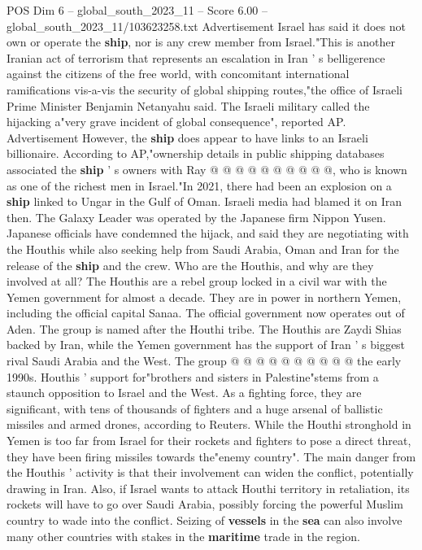 \begin{textsample}{POS Dim 6 – global\_south\_2023\_11 – Score 6.00 – global\_south\_2023\_11/103623258.txt}
Advertisement Israel has said it does not own or operate the \textbf{ship}, nor is any crew member from Israel."This is another Iranian act of terrorism that represents an escalation in Iran ' s belligerence against the citizens of the free world, with concomitant international ramifications vis-a-vis the security of global shipping routes,"the office of Israeli Prime Minister Benjamin Netanyahu said.
The Israeli military called the hijacking a"very grave incident of global consequence", reported AP.
Advertisement However, the \textbf{ship} does appear to have links to an Israeli billionaire.
According to AP,"ownership details in public shipping databases associated the \textbf{ship} ' s owners with Ray @ @ @ @ @ @ @ @ @ @, who is known as one of the richest men in Israel."In 2021, there had been an explosion on a \textbf{ship} linked to Ungar in the Gulf of Oman.
Israeli media had blamed it on Iran then.
The Galaxy Leader was operated by the Japanese firm Nippon Yusen.
Japanese officials have condemned the hijack, and said they are negotiating with the Houthis while also seeking help from Saudi Arabia, Oman and Iran for the release of the \textbf{ship} and the crew.
Who are the Houthis, and why are they involved at all?
The Houthis are a rebel group locked in a civil war with the Yemen government for almost a decade.
They are in power in northern Yemen, including the official capital Sanaa.
The official government now operates out of Aden.
The group is named after the Houthi tribe.
The Houthis are Zaydi Shias backed by Iran, while the Yemen government has the support of Iran ' s biggest rival Saudi Arabia and the West.
The group @ @ @ @ @ @ @ @ @ @ the early 1990s.
Houthis ' support for"brothers and sisters in Palestine"stems from a staunch opposition to Israel and the West.
As a fighting force, they are significant, with tens of thousands of fighters and a huge arsenal of ballistic missiles and armed drones, according to Reuters.
While the Houthi stronghold in Yemen is too far from Israel for their rockets and fighters to pose a direct threat, they have been firing missiles towards the"enemy country".
The main danger from the Houthis ' activity is that their involvement can widen the conflict, potentially drawing in Iran.
Also, if Israel wants to attack Houthi territory in retaliation, its rockets will have to go over Saudi Arabia, possibly forcing the powerful Muslim country to wade into the conflict.
Seizing of \textbf{vessels} in the \textbf{sea} can also involve many other countries with stakes in the \textbf{maritime} trade in the region.

\end{textsample}
